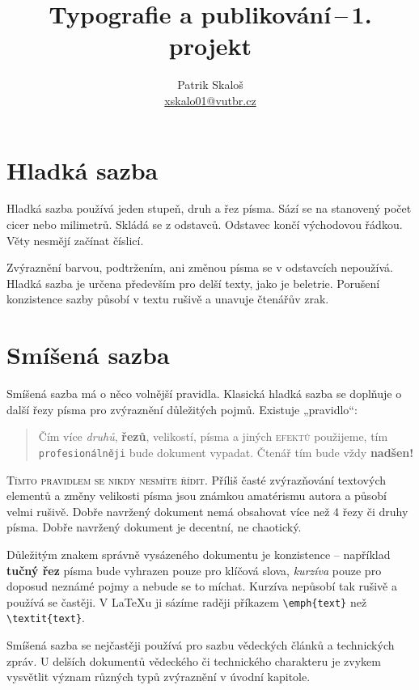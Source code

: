 \documentclass[a4paper, 10pt, twocolumn]{article}
\title{Typografie a publikování\,--\,1. projekt}
\author{Patrik Skaloš \\ \href{xskalo01@vutbr.cz}{xskalo01@vutbr.cz}}
\date{}
\begin{document}
    \maketitle

    \section{Hladká sazba}
    Hladká sazba používá jeden stupeň, druh a řez písma.
    Sází se na stanovený počet cicer nebo milimetrů.
    Skládá se z odstavců. Odstavec končí východovou řádkou.
    Věty nesmějí začínat číslicí.
    \par
    Zvýraznění barvou, podtržením, ani změnou písma se
    v odstavcích nepoužívá. Hladká sazba je určena především
    pro delší texty, jako je beletrie. Porušení konzistence sazby
    působí v textu rušivě a unavuje čtenářův zrak.

    \section{Smíšená sazba}
    Smíšená sazba má o něco volnější pravidla. Klasická hladká sazba se
    doplňuje o další řezy písma pro zvýraznění důležitých pojmů. Existuje „pravidlo“:
    \begin{center}
        \begin{quotation}
            Čím více
            \textit{druhů},
            \textbf{řezů},
            {\tiny velikostí},
            {\color{red}{barev}}
            písma a jiných
            \textsc{efektů}
            použijeme, tím
            \texttt{profesionálněji}
            bude
            {\Large{}\selectfont dokument}
            vypadat.
            \Huge Č\huge t\LARGE e\Large n\large á\normalsize ř\normalsize { }
            \small t\footnotesize í\scriptsize m\normalsize { }
            bude vždy \Huge \textbf{nadšen!}\normalsize \\
        \end{quotation}
    \end{center}
    \par
    \textsc{Tímto pravidlem se nikdy nesmíte řídit.}
    Příliš časté zvýrazňování textových elementů a změny velikosti písma jsou
    známkou amatérismu autora a působí velmi rušivě. Dobře navržený dokument
    nemá obsahovat více než 4 řezy či druhy písma. Dobře navržený dokument je
    decentní, ne chaotický.
    \par
    Důležitým znakem správně vysázeného dokumentu je konzistence – například
    \textbf{tučný řez}
    písma bude vyhrazen pouze pro klíčová slova,
    \textit{kurzíva}
    pouze pro doposud neznámé pojmy a nebude se to míchat.
    Kurzíva nepůsobí tak rušivě a používá se častěji.
    V \LaTeX u ji sázíme raději příkazem
    \verb!\emph{text}! než \verb!\textit{text}!.
    \par
    Smíšená sazba se nejčastěji používá pro sazbu vědeckých článků a technických zpráv.
    U delších dokumentů vědeckého či technického charakteru je zvykem vysvětlit
    význam různých typů zvýraznění v úvodní kapitole.
\end{document}
